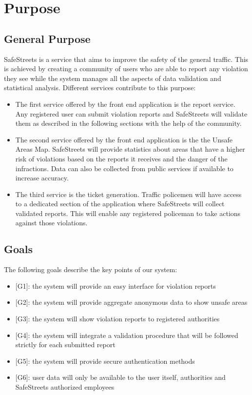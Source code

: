 \section{Purpose}

\subsection{General Purpose}
SafeStreets is a service that aims to improve the safety of the general traffic.
This is achieved by creating a community of users who are able to report any violation they see while the system manages
all the aspects of data validation and statistical analysis.
Different services contribute to this purpose:
\begin{itemize}
  \item The first service offered by the front end application is the report service. Any registered user can submit violation reports and SafeStreets will validate them as described in the following sections with the help of the community.
  \item The second service offered by the front end application is the the Unsafe Areas Map. SafeStreets will provide statistics about areas that have a higher risk of violations based on the reports it receives and the danger of the infractions. Data can also be collected from public services if available to increase accuracy.
  \item The third service is the ticket generation. Traffic policemen will have access to a dedicated section of the application where SafeStreets will collect validated reports. This will enable any registered policeman to take actions against those violations.
\end{itemize}

\subsection{Goals}
The following goals describe the key points of our system:
\begin{itemize}
  \item $[$G1$]$: the system will provide an easy interface for violation reports
  \item $[$G2$]$: the system will provide aggregate anonymous data to show unsafe areas
  \item $[$G3$]$: the system will show violation reports to registered authorities
  \item $[$G4$]$: the system will integrate a validation procedure that will be followed strictly for each submitted report
  \item $[$G5$]$: the system will provide secure authentication methods
  \item $[$G6$]$: user data will only be available to the user itself, authorities and SafeStreets authorized employees
\end{itemize}